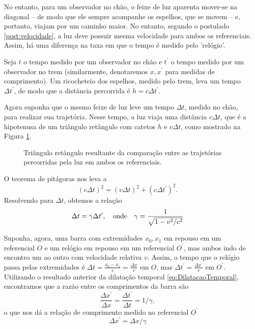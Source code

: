 No entanto, para um observador no chão, o feixe de luz aparenta mover-se na diagonal -- de modo que ele sempre acompanhe os espelhos, que se movem -- e, portanto, viajam por um caminho maior. No entanto, segundo o postulado \ref{post:velocidade}, a luz deve possuir mesma velocidade para ambos os referenciais. Assim, há uma diferença na taxa em que o tempo é medido pelo 'relógio'.

Seja $t$ o tempo medido por um observador no chão e $t^\prime$ o tempo medido por um observador no trem (similarmente, denotaremos $x, x^\prime$ para medidas de comprimento). Um ricocheteio dos espelhos, medido pelo trem, leva um tempo $\Delta t^\prime$, de modo que a distância percorrida é $h = c\Delta t^\prime$.

Agora suponha que o mesmo feixe de luz leve um tempo $\Delta t$, medido no chão, para realizar sua trajetória. Nesse tempo, a luz viaja uma distância $c\Delta t$, que é a hipotenusa de um triângulo retângulo com catetos $h$ e $v\Delta t$, como mostrado na Figura \ref{fig:Pitagoras}.
\begin{figure}[ht]
    \centering
    \caption{Triângulo retângulo resultante da comparação entre as trajetórias percorridas pela luz em ambos os referenciais.}
    \label{fig:Pitagoras}
\end{figure}

O teorema de pitágoras nos leva a 
\[
\left(c\Delta t\right)^2 = \left(v\Delta t\right)^2 + \left( c \Delta t^\prime \right) ^2 .
\]
Resolvendo para $\Delta t$, obtemos a relação
\begin{equation}\label{eq:DilatacaoTemporal}
    \Delta t = \gamma\Delta t^\prime, \qq{onde} \gamma=\frac{1}{\sqrt{1-v^2/c^2}}
\end{equation}



 Suponha, agora, uma barra com extremidades $x_0, x_1$ em repouso em um referencial $O$ e um relógio em repouso em um referencial $O^\prime$, mas ambos indo de encontro um ao outro com velocidade relativa $v$. Assim, o tempo que o relógio passa pelas extremidades é $\Delta t = \frac{x_0-x_1}{v} = \frac{\Delta x}{v}$ em $O$, mas $\Delta t^\prime = \frac{\Delta x^\prime}{v}$ em $O^\prime$. Utilizando o resultado anterior da dilatação temporal \eqref{eq:DilatacaoTemporal}, encontramos que a razão entre os comprimentos da barra são
 \[
   \frac{\Delta x^\prime}{\Delta x} = \frac{\Delta t^\prime}{\Delta t} = 1/\gamma ,
 \]
o que nos dá a relação de comprimento medido no referencial $O^\prime$
\begin{equation}\label{eq:ContracaoEspacial}
    \Delta x^\prime = \Delta x/\gamma
\end{equation}


